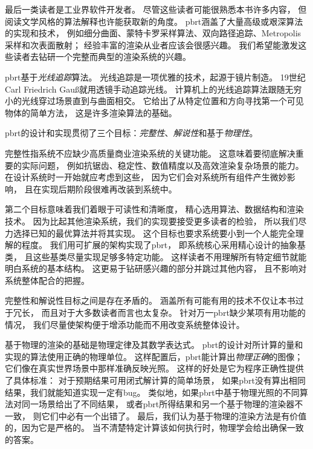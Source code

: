 最后一类读者是工业界软件开发者。
尽管这些读者可能很熟悉本书许多内容，
但阅读文学风格的算法解释也许能获取新的角度。
pbrt涵盖了大量高级或艰深算法的实现和技术，
例如细分曲面、蒙特卡罗采样算法、双向路径追踪、Metropolis采样和次表面散射；
经验丰富的渲染从业者应该会很感兴趣。
我们希望能激发这些读者去钻研一个完整而典型的渲染系统的兴趣。\\


pbrt基于{\itshape 光线追踪}算法。
光线追踪是一项优雅的技术，起源于镜片制造。
19世纪Carl Friedrich Gau{\ss}就用透镜手动追踪光线。
计算机上的光线追踪算法跟随无穷小的光线穿过场景直到与曲面相交。
它给出了从特定位置和方向寻找第一个可见物体的简单方法，
这是许多渲染算法的基础。

pbrt的设计和实现贯彻了三个目标：{\itshape 完整性}、{\itshape 解说性}和基于{\itshape 物理性}。

完整性指系统不应缺少高质量商业渲染系统的关键功能。
这意味着要彻底解决重要的实际问题，
例如抗锯齿、稳定性、数值精度以及高效渲染复杂场景的能力。
在设计系统时一开始就应考虑到这些，
因为它们会对系统所有组件产生微妙影响，
且在实现后期阶段很难再改装到系统中。

第二个目标意味着我们着眼于可读性和清晰度，
精心选用算法、数据结构和渲染技术。
因为比起其他渲染系统，我们的实现要接受更多读者的检验，
所以我们尽力选择已知的最优算法并将其实现。
这个目标也要求系统要小到一个人能完全理解的程度。
我们用可扩展的架构实现了pbrt，
即系统核心采用精心设计的抽象基类，
且这些基类尽量实现足够多特定功能。
这样读者不用理解所有特定细节就能明白系统的基本结构。
这更易于钻研感兴趣的部分并跳过其他内容，
且不影响对系统整体配合的把握。

完整性和解说性目标之间是存在矛盾的。
涵盖所有可能有用的技术不仅让本书过于冗长，
而且对于大多数读者而言也太复杂。
针对万一pbrt缺少某项有用功能的情况，
我们尽量使架构便于增添功能而不用改变系统整体设计。

基于物理的渲染的基础是物理定律及其数学表达式。
pbrt的设计对所计算的量和实现的算法使用正确的物理单位。
这样配置后，pbrt能计算出{\itshape 物理正确}的图像；
它们像在真实世界场景中那样准确反映光照。
这样的好处是它为程序正确性提供了具体标准：
对于预期结果可用闭式解计算的简单场景，
如果pbrt没有算出相同结果，我们就能知道实现一定有bug。
类似地，如果pbrt中基于物理光照的不同算法对同一场景给出了不同结果，
或者pbrt所得结果和另一个基于物理的渲染器不一致，
则它们中必有一个出错了。
最后，我们认为基于物理的渲染方法是有价值的，因为它是严格的。
当不清楚特定计算该如何执行时，物理学会给出确保一致的答案。


